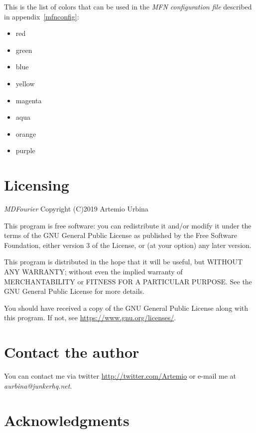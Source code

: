 \documentclass[10pt,a4paper]{report}
\begin{document}
\begin{appendices}
This is the list of colors that can be used in the \textit{MFN configuration file} described in appendix~\ref{mfnconfig}: 

\begin{itemize}
	\item red
	\item green
	\item blue
	\item yellow
	\item magenta
	\item aqua
	\item orange
	\item purple
\end{itemize}

\chapter{Licensing}
\label{license}

\textit{MDFourier} Copyright (C)2019 Artemio Urbina

This program is free software: you can redistribute it and/or modify
it under the terms of the GNU General Public License as published by
the Free Software Foundation, either version 3 of the License, or
(at your option) any later version.

This program is distributed in the hope that it will be useful,
but WITHOUT ANY WARRANTY; without even the implied warranty of
MERCHANTABILITY or FITNESS FOR A PARTICULAR PURPOSE.  See the
GNU General Public License for more details.

You should have received a copy of the GNU General Public License
along with this program.  If not, see \url{https://www.gnu.org/licenses/}.	

\chapter{Contact the author}
\label{contact}

You can contact me via twitter \url{http://twitter.com/Artemio} or e-mail me at \textit{aurbina@junkerhq.net}.

\chapter{Acknowledgments}



\end{appendices}
\end{document}
